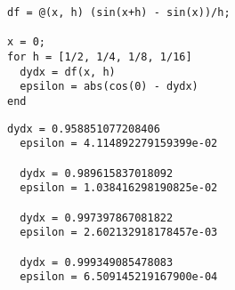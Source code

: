 \begin{lstlisting}
df = @(x, h) (sin(x+h) - sin(x))/h;

x = 0;
for h = [1/2, 1/4, 1/8, 1/16]
  dydx = df(x, h)
  epsilon = abs(cos(0) - dydx)
end
\end{lstlisting}

\begin{lstlisting}[backgroundcolor=\color{cyan}]
  dydx = 0.958851077208406
  epsilon = 4.114892279159399e-02

  dydx = 0.989615837018092
  epsilon = 1.038416298190825e-02

  dydx = 0.997397867081822
  epsilon = 2.602132918178457e-03

  dydx = 0.999349085478083
  epsilon = 6.509145219167900e-04
\end{lstlisting}
